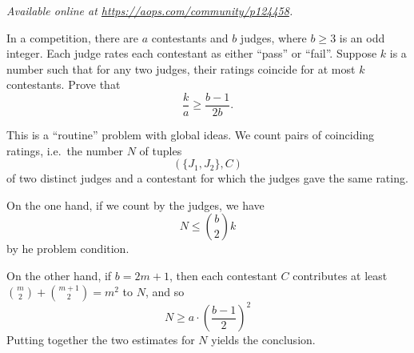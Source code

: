 \textsl{Available online at \url{https://aops.com/community/p124458}.}
\begin{mdframed}[style=mdpurplebox,frametitle={Problem statement}]
In a competition, there are $a$ contestants
and $b$ judges, where $b \ge 3$ is an odd integer.
Each judge rates each contestant as either ``pass'' or ``fail''.
Suppose $k$ is a number such that for any two judges,
their ratings coincide for at most $k$ contestants.
Prove that
\[ \frac ka \ge \frac{b-1}{2b}. \]
\end{mdframed}
This is a ``routine'' problem with global ideas.
We count pairs of coinciding ratings,
i.e.\ the number $N$ of tuples
\[(\{J_1, J_2\}, C) \]
of two distinct judges and a contestant
for which the judges gave the same rating.

On the one hand, if we count by the judges,
we have \[ N \le \binom b2 k \]
by he problem condition.

On the other hand, if $b=2m+1$, then
each contestant $C$
contributes at least $\binom{m}{2} + \binom{m+1}{2} = m^2$ to $N$,
and so
\[ N \ge a \cdot \left( \frac{b-1}{2} \right)^2 \]
Putting together the two estimates for $N$ yields the conclusion.
\pagebreak